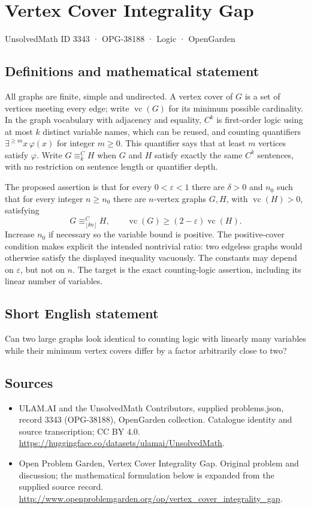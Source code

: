 \documentclass[11pt,a4paper]{article}
\begin{document}
\section*{Vertex Cover Integrality Gap}\label{3343}
{\small UnsolvedMath ID 3343 · OPG-38188 · Logic · OpenGarden}
\subsection{Definitions and mathematical statement}
All graphs are finite, simple and undirected. A vertex cover of $G$ is a
set of vertices meeting every edge; write $\operatorname{vc}(G)$ for its
minimum possible cardinality. In the graph vocabulary with adjacency and
equality, $C^k$ is first-order logic using at most $k$ distinct variable
names, which can be reused, and counting quantifiers
$\exists^{\ge m}x\,\varphi(x)$ for integer $m\ge0$. This quantifier says
that at least $m$ vertices satisfy $\varphi$. Write $G\equiv^C_k H$ when
$G$ and $H$ satisfy exactly the same $C^k$ sentences, with no restriction
on sentence length or quantifier depth.

The proposed assertion is that for every $0<\varepsilon<1$ there are
$\delta>0$ and $n_0$ such that for every integer $n\ge n_0$ there are
$n$-vertex graphs $G,H$, with $\operatorname{vc}(H)>0$, satisfying
\[
 G\equiv^C_{\lfloor\delta n\rfloor}H,
 \qquad \operatorname{vc}(G)\ge(2-\varepsilon)\operatorname{vc}(H).
\]
Increase $n_0$ if necessary so the variable bound is positive. The
positive-cover condition makes explicit the intended nontrivial ratio:
two edgeless graphs would otherwise satisfy the displayed inequality
vacuously. The constants may depend on $\varepsilon$, but not on $n$.
The target is the exact counting-logic assertion, including its linear
number of variables.
\subsection{Short English statement}
Can two large graphs look identical to counting logic with linearly many variables while their minimum vertex covers differ by a factor arbitrarily close to two?
\subsection{Sources}
\begin{itemize}
\item[S1] ULAM.AI and the UnsolvedMath Contributors, supplied problems.json, record 3343 (OPG-38188), OpenGarden collection. Catalogue identity and source transcription; CC BY 4.0.
\url{https://huggingface.co/datasets/ulamai/UnsolvedMath}.
\item[S2] Open Problem Garden, Vertex Cover Integrality Gap. Original problem and discussion; the mathematical formulation below is expanded from the supplied source record.
\url{http://www.openproblemgarden.org/op/vertex_cover_integrality_gap}.
\end{itemize}
\end{document}
